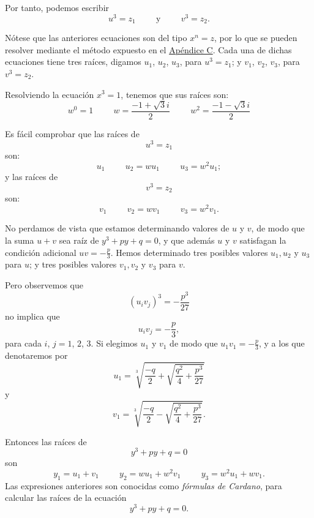 \newpage

Por tanto, podemos escribir
\begin{equation}
    u^3=z_1 \hspace{1cm} \text{y} \hspace{1cm} v^3=z_2. \label{ecuaciongrado3.9}
\end{equation}

Nótese que las anteriores ecuaciones son del tipo $x^n=z$, por lo que se pueden resolver mediante el método expuesto en el \hyperref[FUNDAMENTAL]{Apéndice C}. Cada una de dichas ecuaciones tiene tres raíces, digamos $u_1$, $u_2$, $u_3$, para $u^3=z_1$; y $v_1$, $v_2$, $v_3$, para $v^3=z_2$.

Resolviendo la ecuación $x^3=1$, tenemos que sus raíces son:
$$w^0=1 \hspace{1cm} w=\frac{-1+\sqrt{3}i}{2} \hspace{1cm} w^2=\frac{-1-\sqrt{3}i}{2}$$

Es fácil comprobar que las raíces de
$$u^3=z_1$$
son:
$$u_1 \hspace{1cm} u_2=wu_1 \hspace{1cm} u_3=w^2u_1;$$
y las raíces de
$$v^3=z_2$$
son:
$$v_1 \hspace{1cm} v_2=wv_1 \hspace{1cm} v_3=w^2v_1.$$

No perdamos de vista que estamos determinando valores de $u$ y $v$, de modo que la suma $u+v$ sea raíz de $y^3+py+q=0$, y que además $u$ y $v$ satisfagan la condición adicional $\displaystyle uv=-\frac{p}{3}$. Hemos determinado tres posibles valores $u_1,  u_2$ y $u_3$ para $u$; y tres posibles valores $v_1,  v_2$ y $v_3$ para $v$.

Pero observemos que
$$\left(u_i v_j\right)^3=-\frac{p^3}{27}$$
no implica que
$$u_i v_j=-\frac{p}{3},$$
para cada $i$, $j = 1$, $2$, $3$. Si elegimos $u_1$ y $v_1$ de modo que $\displaystyle u_1v_1=-\frac{p}{3}$, y a los que denotaremos por
\begin{equation}
    u_1=\sqrt[3]{\frac{-q}{2}+\sqrt{\frac{q^2}{4}+\frac{p^3}{27}}} \label{APPCOSIPA1}
\end{equation}
y
\begin{equation}
    v_1=\sqrt[3]{\frac{-q}{2}-\sqrt{\frac{q^2}{4}+\frac{p^3}{27}}}. \label{APPCOSIPA2}
\end{equation}

Entonces las raíces de
$$y^3+py+q=0$$
son
\begin{equation}
    y_1=u_1+v_1 \hspace{1cm} y_2=wu_1+w^2v_1 \hspace{1cm} y_3=w^2u_1+wv_1. \label{APPCOSIPA3}
\end{equation}
Las expresiones anteriores son conocidas como \emph{fórmulas de Cardano}, para calcular las raíces de la ecuación
$$y^3+py+q=0.$$


